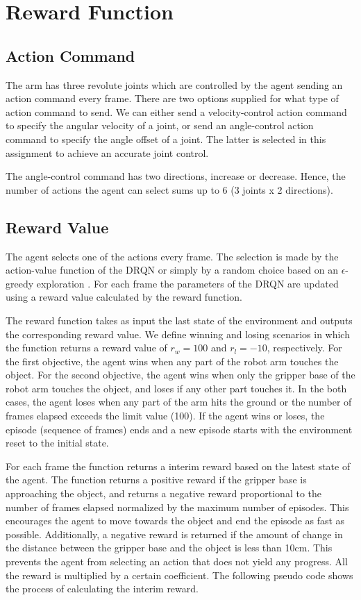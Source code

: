 \documentclass[a4paper]{article}
\begin{document}
\section{Reward Function}
\subsection{Action Command}
The arm has three revolute joints which are controlled by the agent sending an action command every frame. There are two options supplied for what type of action command to send. We can either send a velocity-control action command to specify the angular velocity of a joint, or send an angle-control action command to specify the angle offset of a joint. The latter is selected in this assignment to achieve an accurate joint control.

The angle-control command has two directions, increase or decrease. Hence, the  number of actions the agent can select sums up to 6 (3 joints x 2 directions).

\subsection{Reward Value}
The agent selects one of the actions every frame. The selection is made by the action-value function of the DRQN or simply by a random choice based on an \(\epsilon\)-greedy exploration \cite{Zhan2016}. For each frame the parameters of the DRQN are updated using a reward value calculated by the reward function.

The reward function takes as input the last state of the environment and outputs the corresponding reward value. We define winning and losing scenarios in which the function returns a reward value of \(r_w=100\) and \(r_l=-10\), respectively. For the first objective, the agent wins when any part of the robot arm touches the object. For the second objective, the agent wins when only the gripper base of the robot arm touches the object, and loses if any other part touches it. In the both cases, the agent loses when any part of the arm hits the ground or the number of frames elapsed exceeds the limit value (100). If the agent wins or loses, the episode (sequence of frames) ends and a new episode starts with the environment reset to the initial state.

For each frame the function returns a interim reward based on the latest state of the agent. The function returns a positive reward if the gripper base is approaching the object, and returns a negative reward proportional to the number of frames elapsed normalized by the maximum number of episodes. This encourages the agent to move towards the object and end the episode as fast as possible. Additionally, a negative reward is returned if the amount of change in the distance between the gripper base and the object is less than 10cm. This prevents the agent from selecting an action that does not yield any progress. All the reward is multiplied by a certain coefficient. The following pseudo code shows the process of calculating the interim reward.
\end{document}

